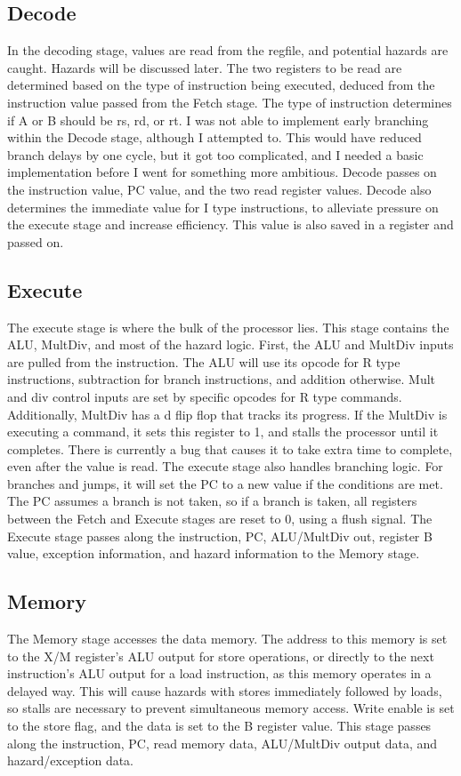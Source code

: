 \documentclass[letterpaper]{article} %
\begin{document}
\subsection*{Decode}
In the decoding stage, values are read from the regfile, and potential hazards are caught. Hazards will be discussed later. The two registers to be read are determined based on the type of instruction being executed, deduced from the instruction value passed from the Fetch stage. The type of instruction determines if A or B should be rs, rd, or rt. I was not able to implement early branching within the Decode stage, although I attempted to. This would have reduced branch delays by one cycle, but it got too complicated, and I needed a basic implementation before I went for something more ambitious. Decode passes on the instruction value, PC value, and the two read register values. Decode also determines the immediate value for I type instructions, to alleviate pressure on the execute stage and increase efficiency. This value is also saved in a register and passed on. \\

\subsection*{Execute}
The execute stage is where the bulk of the processor lies. This stage contains the ALU, MultDiv, and most of the hazard logic. First, the ALU and MultDiv inputs are pulled from the instruction. The ALU will use its opcode for R type instructions, subtraction for branch instructions, and addition otherwise. Mult and div control inputs are set by specific opcodes for R type commands. Additionally, MultDiv has a d flip flop that tracks its progress. If the MultDiv is executing a command, it sets this register to 1, and stalls the processor until it completes. There is currently a bug that causes it to take extra time to complete, even after the value is read. The execute stage also handles branching logic. For branches and jumps, it will set the PC to a new value if the conditions are met. The PC assumes a branch is not taken, so if a branch is taken, all registers between the Fetch and Execute stages are reset to 0, using a flush signal. The Execute stage passes along the instruction, PC, ALU/MultDiv out, register B value, exception information, and hazard information to the Memory stage. \\

\subsection*{Memory}
The Memory stage accesses the data memory. The address to this memory is set to the X/M register's ALU output for store operations, or directly to the next instruction's ALU output for a load instruction, as this memory operates in a delayed way. This will cause hazards with stores immediately followed by loads, so stalls are necessary to prevent simultaneous memory access. Write enable is set to the store flag, and the data is set to the B register value. This stage passes along the instruction, PC, read memory data, ALU/MultDiv output data, and hazard/exception data. \\
\end{document}
